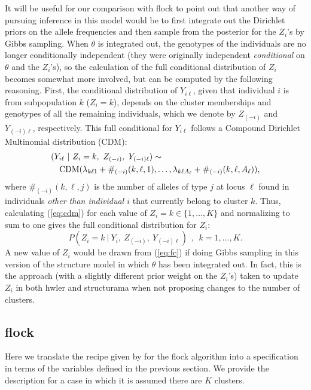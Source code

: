 It will be useful for our comparison with {\sc flock} to point out that another way 
of pursuing inference in this model would be to first integrate out the 
Dirichlet priors on the allele frequencies and then sample from the posterior
for the $Z_i$'s by Gibbs sampling.  When $\theta$ is integrated out, the genotypes 
of the individuals are no longer conditionally independent (they were originally
independent {\em conditional} on $\theta$ and the $Z_i$'s), so the calculation of 
the full conditional distribution of $Z_i$ becomes somewhat more involved,
but can be computed by the following reasoning. First, the 
conditional distribution of $Y_{i\ell}$, given that individual $i$ is from subpopulation $k$
(\ie $Z_i=k$), depends on the 
cluster memberships and genotypes  of all the remaining individuals,
which we denote by  $Z_{(-i)}$ and $Y_{(-i)\ell}$, respectively.
This full conditional for $Y_{i\ell}$ follows 
a Compound Dirichlet Multinomial distribution (CDM):
\begin{eqnarray}
\lefteqn{(Y_{i\ell}~|~Z_i=k,~Z_{(-i)},~Y_{(-i)\ell}) \sim} \label{eq:cdm}\\
& & \mathrm{CDM}(\lambda_{k\ell 1} + \#_{(-i)}(k,\ell,1), \ldots,
\lambda_{k\ell A_\ell} + \#_{(-i)}(k,\ell,A_\ell)), \nonumber
\end{eqnarray}
where $\#_{(-i)}(k,\ell,j)$ is the number of alleles of type $j$ at locus $\ell$
found in individuals {\em other than individual $i$} that currently
belong to cluster $k$. Thus, calculating (\ref{eq:cdm}) for each value of $Z_i=k \in 
\{1,\ldots,K\}$ 
and normalizing to sum to one gives the full conditional distribution for 
$Z_i$:
\begin{equation}
P(Z_i=k~|~Y_i, ~Z_{(-i)},~Y_{(-i)\ell})~~,~~k=1,\ldots,K.
\label{eq:fc}
\end{equation}
A new value of $Z_i$ would be drawn from (\ref{eq:fc}) if doing Gibbs sampling in this
version of the {\sc structure} model in which $\theta$ has been integrated out.  In 
fact,
this is the approach (with a slightly different prior weight on the $Z_i$'s) taken to 
update 
$Z_i$ in both {\sc hwler} \citep{Pel&Mas2006} and {\sc structurama} \cite{Hue&And2007} 
when not
proposing changes to the number of clusters.



\subsection*{{\sc flock}}
Here we translate the recipe given by \citeauthor{Duc&Tur2009} for the 
{\sc flock} algorithm into a specification in terms of the variables
defined in the previous section.  We provide the description for a case in which
it is assumed there are $K$ clusters.

